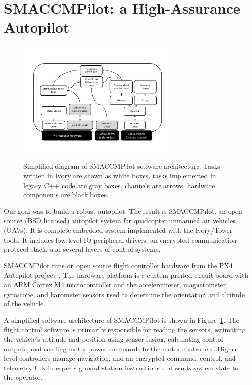 \section{SMACCMPilot: a High-Assurance Autopilot}
\label{sec:smaccmpilot}

\begin{figure}[ht!]
  \begin{center}
\includegraphics[width=8cm]{figures/smaccmpilot-diagram-jan14}
  \end{center}
\caption[SMACCMPilot software architecture]{
Simplified diagram of SMACCMPilot
software architecture. Tasks written in Ivory are shown as white boxes,
tasks implemented in legacy C++ code are gray boxes,
channels are arrows,
hardware components are black boxes.}
\label{fig:smaccmpilotSwArch}
\end{figure}

Our goal was to build a robust autopilot. The result is
SMACCMPilot, an open-source (BSD licensed) autopilot system for quadcopter
unmanned air vehicles (UAVs).
It is complete embedded system implemented with
the Ivory/Tower tools.
It includes low-level IO peripheral drivers, an encrypted
communication protocol stack, and several layers of control systems.

SMACCMPilot runs on open source flight controller hardware from the PX4
Autopilot project~\cite{px4-proj}. The hardware platform is
a custom printed circuit board with an ARM Cortex M4 microcontroller and the
accelerometer, magnetometer, gyroscope, and barometer sensors used to
determine the orientation and altitude of the vehicle.

A simplified software architecture of SMACCMPilot is shown in
Figure~\ref{fig:smaccmpilotSwArch}.
The flight control software is primarily responsible for reading the sensors,
estimating the vehicle's attitude and position using sensor fusion, calculating
control outputs, and sending motor power commands to the motor controllers.
Higher level controllers manage navigation, and an encrypted command, control,
and telemetry link interprets ground station instructions and sends system state
to the operator.

